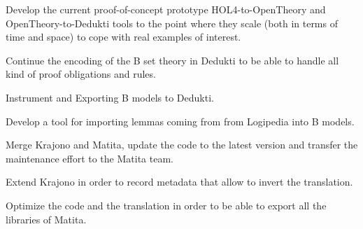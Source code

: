 \begin{workpackage}
\begin{tasklist}
\begin{task}[id=HOL4,
  title=Instrument HOL4,
  lead=Cha,
  ChaRM=16.5]
%
\begin{compactitem}
\item Develop the current proof-of-concept prototype
    HOL4-to-OpenTheory and OpenTheory-to-Dedukti tools to the point
    where they scale (both in terms of time and space) to cope with
    real examples of interest.
\end{compactitem}
\end{task}

\begin{task}[id=atelier-b,
  title=Instrument Atelier-B/Rodin,
  lead=Cle,
  CleRM=0, %
  ImtRM=0, %
  TouRM=0] %
%
\begin{compactitem}
\item Continue the encoding of the B set theory in Dedukti to be
  able to handle all kind of proof obligations and rules.
\item Instrument and Exporting B models to Dedukti.
\item Develop a tool for importing lemmas coming from from Logipedia
into B models.
\end{compactitem}
\end{task}

\begin{task}[id=matita,
  title=Integrate the Matita translator in Matita itself,
  lead=Bol,
  BolRM=4,
  wphases=0-12]
\begin{compactitem}
\item Merge Krajono and Matita, update the code to the latest
  version and transfer the maintenance effort to the Matita team.
\item Extend Krajono in order to record metadata that allow to
  invert the translation.
\item Optimize the code and the translation in order to be able to
  export all the libraries of Matita.
\end{compactitem}
\end{task}


\end{tasklist}
\end{workpackage}
